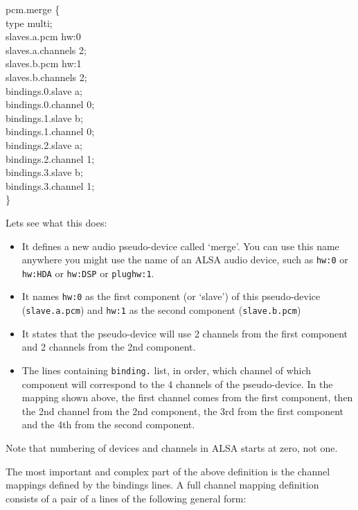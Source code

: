 \documentclass[10pt,a4paper]{book}
\begin{document}
{\begin{enumerate}
\begin{itemize}
\begin{listing}
pcm.merge \{\\
    type multi;\\
    slaves.a.pcm hw:0\\
    slaves.a.channels 2;\\
    slaves.b.pcm hw:1\\
    slaves.b.channels 2;\\
    bindings.0.slave a;\\
    bindings.0.channel 0;\\
    bindings.1.slave b;\\
    bindings.1.channel 0;\\
    bindings.2.slave a;\\
    bindings.2.channel 1;\\
    bindings.3.slave b;\\
    bindings.3.channel 1;\\
\}\\
\end{listing}

Lets see what this does:

\begin{itemize}

\item It defines a new audio pseudo-device called `merge'. You can use
  this name anywhere you might use the name of an ALSA audio device,
  such as \texttt{hw:0} or \texttt{hw:HDA} or \texttt{hw:DSP} or
  \texttt{plughw:1}.
\item It names \texttt{hw:0} as the first component (or `slave') of
  this pseudo-device (\texttt{slave.a.pcm}) and \texttt{hw:1} as the
  second component (\texttt{slave.b.pcm})
\item It states that the pseudo-device will use 2 channels from the
  first component and 2 channels from the 2nd component.
\item The lines containing \texttt{binding.} list, in order, which
  channel of which component will correspond to the 4 channels of the
  pseudo-device. In the mapping shown above, the first channel comes
  from the first component, then the 2nd channel from the 2nd
  component, the 3rd from the first component and the 4th from the
  second component.

\end{itemize}

Note that numbering of devices and channels in ALSA starts at zero,
not one.

The most important and complex part of the above definition is the
channel mappings defined by the bindings lines. A full channel mapping
definition consists of a pair of a lines of the following general
form:


\end{itemize}
\end{enumerate}}
\end{document}
